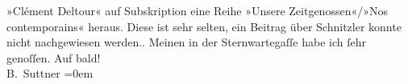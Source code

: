 \begin{ledgroupsized}[t]{13cm}
{{{                  »Clément Deltour« auf Subskription eine Reihe »Unsere Zeitgenossen«/»Nos
                  contemporains« heraus. Diese ist sehr selten, ein Beitrag über Schnitzler konnte nicht nachgewiesen werden.}}}\label{K_L02156-2h}.\pend
           \pstart
           Meinen \label{K_L02156-3v}\label{K_L02156-3h} in der Sternwartegaſſe habe ich ſehr
               genoſſen.\pend
           \pstart
           Auf bald!{\\[\baselineskip]}\spacefill\mbox{B. Suttner}\pend
           \leftskip=0em{}
         
         \endnumbering{}\end{ledgroupsized}  \newcommand{\dateiname}{L02156}\newcommand{\titel}{Bertha von Suttner an Arthur Schnitzler, 4. 11. 1913}\newcommand{\editorInnen}{Martin Anton Müller und Gerd-Hermann Susen}
      